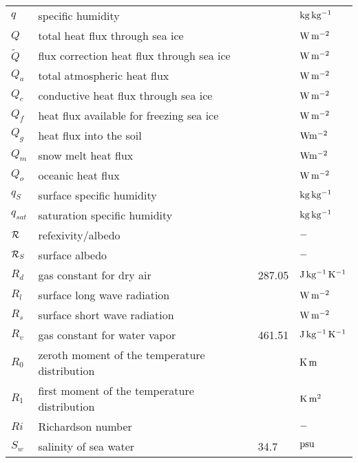 \begin{tabular*}{\textwidth}{|l@{\extracolsep\fill}lll|}
$q$       & specific humidity                     &         & $\rm kg\,
kg^{-1}$ \\
$Q$       & total heat flux through sea ice       &         & $\rm W\, m^{-2}$
\\
$\tilde{Q}$    & flux correction heat flux through sea ice  &         & $\rm W\, m^{-2}$
\\
$Q_a$          & total atmospheric heat flux                &         & $\rm W\,
m^{-2}$ \\
$Q_c$          & conductive heat flux through sea ice       &         & $\rm W\,
m^{-2}$ \\
$Q_f$          & heat flux available for freezing sea ice   &         & $\rm W\, m^{-2}$
\\
$Q_g$     & heat flux into the soil     &    & $\rm W m^{-2}$ \\
$Q_m$     & snow melt heat flux    &    & $\rm W m^{-2}$ \\
$Q_o$          & oceanic heat flux                     &         & $\rm W\, m^{-2}$
\\
$q_S$          & surface specific humidity             &         & $\rm kg\,
kg^{-1}$ \\
$q_{sat}$      & saturation specific humidity               &         & $\rm kg\,
kg^{-1}$ \\
${\cal R}$     & refexivity/albedo      &    &$\rm -$ \\
${\cal R}_S$   & surface albedo    &    & $\rm -$ \\
$R_d$          & gas constant for dry air              & 287.05  & $\rm J\,
kg^{-1}\, K^{-1}$ \\
$R_l$          & surface long wave radiation           &         & $\rm W\,
m^{-2}$ \\
$R_s$          & surface short wave radiation               &         & $\rm W\,
m^{-2}$ \\
$R_v$          & gas constant for water vapor               & 461.51  &
$\rm J\, kg^{-1}\, K^{-1}$ \\
$R_{0}$   & zeroth moment of the temperature distribution   &         & $\rm K\,
m$ \\
$R_{1}$   & first moment of the temperature distribution    &         & $\rm K\,
m^2$ \\
$Ri$           & Richardson number                     &         & $\rm -$ \\ 
$S_w$          & salinity of sea water                 & 34.7    
     & $\rm psu$ \\

\hline
\end{tabular*}
\newpage

